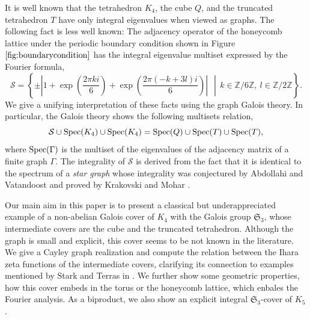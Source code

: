 \documentclass[lualatex,12pt]{article}
\begin{document}
It is well known that the tetrahedron $K_4$,
the cube $Q$, and the truncated tetrahedron $T$ have
only integral eigenvalues when viewed as graphs.
The following fact is less well known:
The adjacency operator of the honeycomb lattice 
under the periodic boundary
condition shown in Figure $\ref{fig:boundarycondition}$
has the integral eigenvalue multiset expressed by the Fourier formula,
\[
 {\mathcal S}=\left\{\pm\left|1+\exp\left({\frac{2\pi{k}{i}}{6}}\right) +
 \exp\left({\frac{2\pi{(-k+3l)}{i}}{6}}\right) \right|~~\middle|\,
 k\in {\mathbb Z}/6{\mathbb Z},~ l\in {\mathbb Z}/2{\mathbb Z}\right\}.
\]
We give a unifying interpretation of these facts
using the graph Galois theory.
In particular, the Galois theory shows the following multisets relation,
\[
 {\mathcal S} \cup {\rm Spec}(K_4) \cup {\rm Spec}(K_4)
 =
 {\rm Spec}(Q) \cup {\rm Spec}(T) \cup {\rm Spec}(T),
\]
where ${\rm Spec}(\Gamma)$ is the multiset of the eigenvalues
of the adjacency matrix of a finite graph $\Gamma$.
The integrality of ${\mathcal S}$ is derived from the fact that
it is identical to the spectrum of a {\em star graph}
whose integrality was conjectured by Abdollahi and Vatandoost
\cite{abdollahi2009cayley} and
proved by Krakovski and Mohar \cite{krakovski2012spectrum}.


Our main aim in this paper is to  present a classical but underappreciated example of 
a non-abelian Galois cover of $K_4$ with the Galois group ${\mathfrak S}_3$, 
whose intermediate covers are the cube and the truncated tetrahedron. 
Although the graph is small and explicit, 
this cover seems to be not known in the literature. 
We give a Cayley graph realization and compute the relation
between the Ihara zeta functions of the intermediate covers, 
clarifying its connection to examples mentioned by Stark and Terras in \cite{stark2000zeta}. 
We further show some geometric properties,
how this cover embeds in the torus or the honeycomb lattice,
which enbales the Fourier analysis.
As a biproduct, we also show an explicit integral ${\mathfrak S}_3$-cover of $K_5$.
\end{document}
